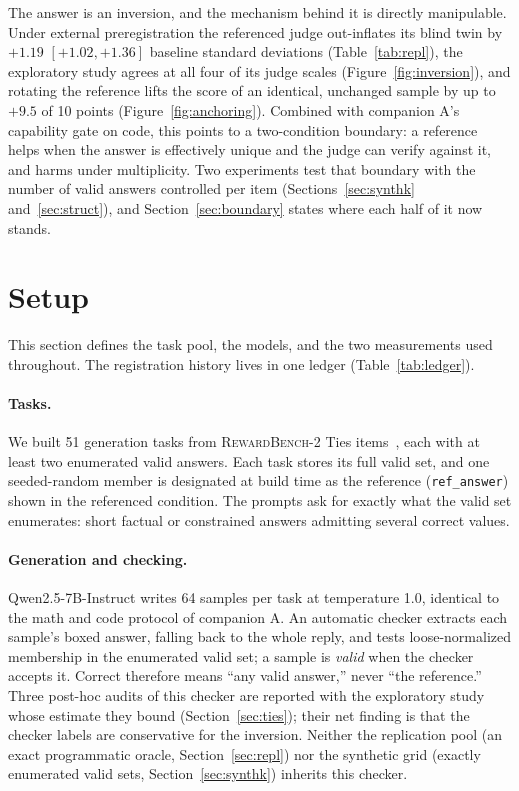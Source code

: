 \documentclass[11pt]{article}
\begin{document}
The answer is an inversion, and the mechanism behind it is directly manipulable.
Under external preregistration the referenced judge out-inflates its blind twin by $+1.19$ $[+1.02, +1.36]$ baseline standard deviations (Table~\ref{tab:repl}), the exploratory study agrees at all four of its judge scales (Figure~\ref{fig:inversion}), and rotating the reference lifts the score of an identical, unchanged sample by up to $+9.5$ of 10 points (Figure~\ref{fig:anchoring}).
Combined with companion A's capability gate on code, this points to a two-condition boundary: a reference helps when the answer is effectively unique and the judge can verify against it, and harms under multiplicity.
Two experiments test that boundary with the number of valid answers controlled per item (Sections~\ref{sec:synthk} and~\ref{sec:struct}), and Section~\ref{sec:boundary} states where each half of it now stands.

\section{Setup}
\label{sec:setup}

This section defines the task pool, the models, and the two measurements used throughout.
The registration history lives in one ledger (Table~\ref{tab:ledger}).

\paragraph{Tasks.}
We built 51 generation tasks from \textsc{RewardBench-2} Ties items~\cite{malik2025rewardbench2}, each with at least two enumerated valid answers.
Each task stores its full valid set, and one seeded-random member is designated at build time as the reference (\texttt{ref\_answer}) shown in the referenced condition.
The prompts ask for exactly what the valid set enumerates: short factual or constrained answers admitting several correct values.

\paragraph{Generation and checking.}
Qwen2.5-7B-Instruct writes 64 samples per task at temperature 1.0, identical to the math and code protocol of companion A.
An automatic checker extracts each sample's boxed answer, falling back to the whole reply, and tests loose-normalized membership in the enumerated valid set; a sample is \emph{valid} when the checker accepts it.
Correct therefore means ``any valid answer,'' never ``the reference.''
Three post-hoc audits of this checker are reported with the exploratory study whose estimate they bound (Section~\ref{sec:ties}); their net finding is that the checker labels are conservative for the inversion.
Neither the replication pool (an exact programmatic oracle, Section~\ref{sec:repl}) nor the synthetic grid (exactly enumerated valid sets, Section~\ref{sec:synthk}) inherits this checker.
\end{document}

